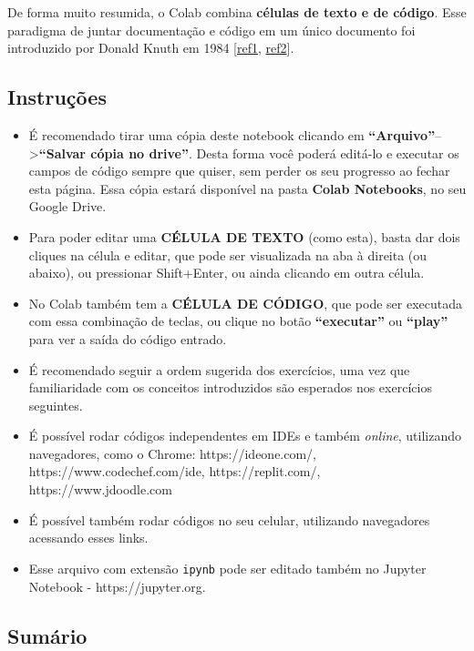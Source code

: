 \documentclass[12pt,a4paper]{article}
\providecommand{\tightlist}{%
      \setlength{\itemsep}{0pt}\setlength{\parskip}{0pt}}
\begin{document}
De forma muito resumida, o Colab combina \textbf{células de texto e de
código}. Esse paradigma de juntar documentação e código em um único
documento foi introduzido por Donald Knuth em 1984
{[}\href{https://www-cs-faculty.stanford.edu/~knuth/}{ref1},
\href{http://www.literateprogramming.com}{ref2}{]}.

    \hypertarget{instruuxe7uxf5es}{%
\subsection{Instruções}\label{instruuxe7uxf5es}}

    \begin{itemize}
\tightlist
\item
  É recomendado tirar uma cópia deste notebook clicando em
  \textbf{``Arquivo''}--\textgreater{}\textbf{``Salvar cópia no
  drive''}. Desta forma você poderá editá-lo e executar os campos de
  código sempre que quiser, sem perder os seu progresso ao fechar esta
  página. Essa cópia estará disponível na pasta \textbf{Colab
  Notebooks}, no seu Google Drive.
\item
  Para poder editar uma \textbf{CÉLULA DE TEXTO} (como esta), basta dar
  dois cliques na célula e editar, que pode ser visualizada na aba à
  direita (ou abaixo), ou pressionar Shift+Enter, ou ainda clicando em
  outra célula.
\item
  No Colab também tem a \textbf{CÉLULA DE CÓDIGO}, que pode ser
  executada com essa combinação de teclas, ou clique no botão
  \textbf{``executar''} ou \textbf{``play''} para ver a saída do código
  entrado.
\item
  É recomendado seguir a ordem sugerida dos exercícios, uma vez que
  familiaridade com os conceitos introduzidos são esperados nos
  exercícios seguintes.
\item
  É possível rodar códigos independentes em IDEs e também \emph{online},
  utilizando navegadores, como o Chrome: https://ideone.com/,
  https://www.codechef.com/ide, https://replit.com/,
  https://www.jdoodle.com
\item
  É possível também rodar códigos no seu celular, utilizando navegadores
  acessando esses links.
\item
  Esse arquivo com extensão \texttt{ipynb} pode ser editado também no
  Jupyter Notebook - https://jupyter.org.
\end{itemize}

    \hypertarget{sumuxe1rio}{%
\subsection{Sumário}\label{sumuxe1rio}}
\end{document}
